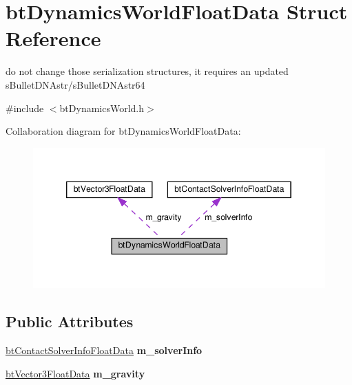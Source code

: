 \hypertarget{structbtDynamicsWorldFloatData}{}\section{bt\+Dynamics\+World\+Float\+Data Struct Reference}
\label{structbtDynamicsWorldFloatData}


do not change those serialization structures, it requires an updated s\+Bullet\+D\+N\+Astr/s\+Bullet\+D\+N\+Astr64  




{\ttfamily \#include $<$bt\+Dynamics\+World.\+h$>$}



Collaboration diagram for bt\+Dynamics\+World\+Float\+Data\+:
\nopagebreak
\begin{figure}[H]
\begin{center}
\leavevmode
\includegraphics[width=346pt]{structbtDynamicsWorldFloatData__coll__graph}
\end{center}
\end{figure}
\subsection*{Public Attributes}
\begin{DoxyCompactItemize}
\item 
\mbox{\label{structbtDynamicsWorldFloatData_aee3ebe6549fd707d03363c3a16dd6cc2}} 
\hyperlink{structbtContactSolverInfoFloatData}{bt\+Contact\+Solver\+Info\+Float\+Data} {\bfseries m\+\_\+solver\+Info}
\item 
\mbox{\label{structbtDynamicsWorldFloatData_ad3c05a12d9c1782940e0bbc053d2c8d7}} 
\hyperlink{structbtVector3FloatData}{bt\+Vector3\+Float\+Data} {\bfseries m\+\_\+gravity}
\end{DoxyCompactItemize}


